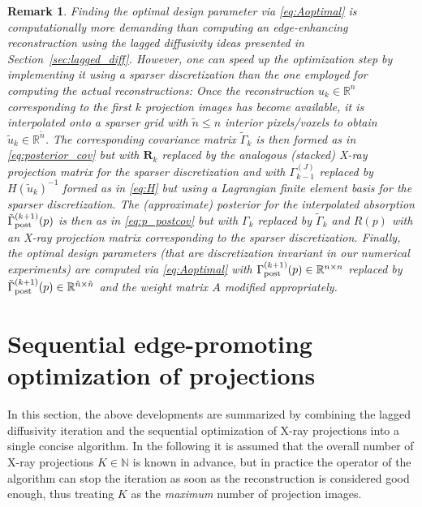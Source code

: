 \documentclass[final]{siamltex}
\newcommand{\N}{\mathbb{N}}
\newcommand{\R}{\mathbb{R}}
\newtheorem{remark}[theorem]{Remark}
\begin{document}
\begin{remark}
  \label{rm:discr}
  Finding the optimal design parameter via \eqref{eq:Aoptimal} is computationally more demanding than computing an edge-enhancing reconstruction using the lagged diffusivity ideas presented in Section~\ref{sec:lagged_diff}. However, one can speed up the optimization step by implementing it using a sparser discretization than the one employed for computing the actual reconstructions: Once the reconstruction $u_{k} \in \R^n$ corresponding to the first $k$ projection images has become available, it is interpolated onto a sparser grid with $\tilde{n} \leq n$ interior pixels/voxels to obtain $\tilde{u}_k \in \R^{\tilde{n}}$. The corresponding covariance matrix $\tilde{\Gamma}_k$ is then formed as in \eqref{eq:posterior_cov} but with $\mathbf{R}_k$ replaced by the analogous (stacked) X-ray projection matrix for the sparser discretization and with $\Gamma_{k-1}^{(J)}$ replaced by $H(\tilde{u}_{k})^{-1}$ formed as in \eqref{eq:H} but using a Lagrangian finite element basis for the sparser discretization. The (approximate) posterior for the interpolated absorption $\tilde{\Gamma}_{\rm post}^{(k+1)}(p)$ is then as in \eqref{eq:p_postcov} but with $\Gamma_k$ replaced by $\tilde{\Gamma}_k$ and $R(p)$ with an X-ray projection matrix corresponding to the sparser discretization. Finally, the optimal design parameters (that are discretization invariant in our numerical experiments) are computed via \eqref{eq:Aoptimal} with $\Gamma_{\rm post}^{(k+1)}(p) \in \R^{n \times n}$ replaced by $\tilde{\Gamma}_{\rm post}^{(k+1)}(p) \in \R^{\tilde{n} \times \tilde{n}}$ and the weight matrix $A$ modified appropriately.
  \end{remark}


\section{Sequential edge-promoting optimization of projections}
\label{sec:opti}

In this section, the above developments are summarized by combining the lagged diffusivity iteration and the sequential optimization of X-ray projections into a single concise algorithm. In the following it is assumed that the overall number of X-ray projections $K \in \N$ is known in advance, but in practice the operator of the algorithm can stop the iteration as soon as the reconstruction is considered good enough, thus treating $K$ as the {\em maximum} number of projection images.
\end{document}
